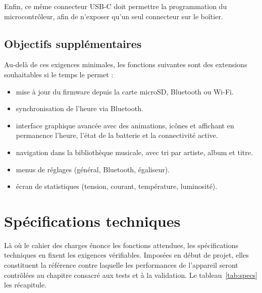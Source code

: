 Enfin, ce même connecteur USB-C doit permettre la programmation du microcontrôleur, afin de n'exposer qu'un seul connecteur sur le boîtier.

\subsection{Objectifs supplémentaires}
Au-delà de ces exigences minimales, les fonctions suivantes sont des extensions souhaitables si le temps le permet :
\begin{itemize}
      \item mise à jour du firmware depuis la carte microSD, Bluetooth ou Wi-Fi.
      \item synchronisation de l'heure via Bluetooth.
      \item interface graphique avancée avec des animations, icônes et affichant en permanence l'heure, l'état de la
            batterie et la connectivité active.
      \item navigation dans la bibliothèque musicale, avec tri par artiste, album
            et titre.
      \item menus de réglages (général, Bluetooth, égaliseur).
      \item écran de statistiques (tension, courant, température, luminosité).
\end{itemize}

\section{Spécifications techniques}
Là où le cahier des charges énonce les fonctions attendues, les spécifications techniques en fixent les exigences vérifiables. Imposées en début de projet, elles constituent la référence contre laquelle les performances de l'appareil seront contrôlées au chapitre consacré aux tests et à la validation. Le tableau~\ref{tab:specs} les récapitule.

